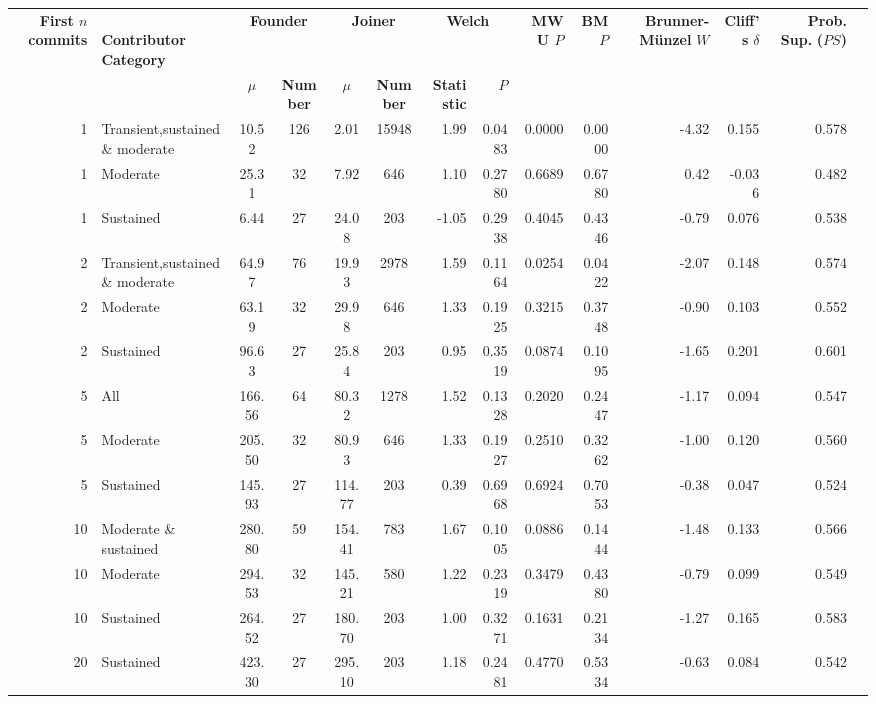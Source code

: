 \begin{landscape}
\begin{table}[H]
\begin{tabular}{r p{4cm} c c c c r r r r r r r r}
\toprule
\makecell[t]{\textbf{First $n$}\\\textbf{commits}} & \makecell[t]{\textbf{}\\\textbf{Contributor}\\\textbf{Category}} & \multicolumn{2}{c}{\textbf{Founder}} & \multicolumn{2}{c}{\textbf{Joiner}} & \multicolumn{2}{c}{\textbf{Welch}} & \textbf{MWU $P$} & \textbf{BM $P$} & \makecell[t]{\textbf{}\\\textbf{Brunner-Münzel}\\\textbf{$W$}} & \makecell[t]{\textbf{Cliff's}\\\textbf{$\delta$}} & \makecell[t]{\textbf{Prob. Sup.}\\\textbf{($PS$)}} \\ 
\cmidrule(lr){3-4} \cmidrule(lr){5-6} \cmidrule(lr){7-8}
 &  & \textbf{$\mu$} & \textbf{Number} & \textbf{$\mu$} & \textbf{Number} & \textbf{Statistic} & \textbf{$P$} &  &  &  &  &  \\ 
\midrule
1 & Transient,sustained \& moderate &  10.52 & 126 & 2.01 & 15948 & 1.99 & 0.0483 & 0.0000 & 0.0000 & -4.32 & 0.155 & 0.578 \\ 
1 & Moderate &  25.31 & 32 & 7.92 & 646 & 1.10 & 0.2780 & 0.6689 & 0.6780 & 0.42 & -0.036 & 0.482 \\ 
1 & Sustained &  6.44 & 27 & 24.08 & 203 & -1.05 & 0.2938 & 0.4045 & 0.4346 & -0.79 & 0.076 & 0.538 \\ 
2 & Transient,sustained \& moderate &  64.97 & 76 & 19.93 & 2978 & 1.59 & 0.1164 & 0.0254 & 0.0422 & -2.07 & 0.148 & 0.574 \\ 
2 & Moderate &  63.19 & 32 & 29.98 & 646 & 1.33 & 0.1925 & 0.3215 & 0.3748 & -0.90 & 0.103 & 0.552 \\ 
2 & Sustained &  96.63 & 27 & 25.84 & 203 & 0.95 & 0.3519 & 0.0874 & 0.1095 & -1.65 & 0.201 & 0.601 \\ 
5 & All &  166.56 & 64 & 80.32 & 1278 & 1.52 & 0.1328 & 0.2020 & 0.2447 & -1.17 & 0.094 & 0.547 \\ 
5 & Moderate &  205.50 & 32 & 80.93 & 646 & 1.33 & 0.1927 & 0.2510 & 0.3262 & -1.00 & 0.120 & 0.560 \\ 
5 & Sustained &  145.93 & 27 & 114.77 & 203 & 0.39 & 0.6968 & 0.6924 & 0.7053 & -0.38 & 0.047 & 0.524 \\ 
10 & Moderate \& sustained &  280.80 & 59 & 154.41 & 783 & 1.67 & 0.1005 & 0.0886 & 0.1444 & -1.48 & 0.133 & 0.566 \\ 
10 & Moderate &  294.53 & 32 & 145.21 & 580 & 1.22 & 0.2319 & 0.3479 & 0.4380 & -0.79 & 0.099 & 0.549 \\ 
10 & Sustained &  264.52 & 27 & 180.70 & 203 & 1.00 & 0.3271 & 0.1631 & 0.2134 & -1.27 & 0.165 & 0.583 \\ 
20 & Sustained &  423.30 & 27 & 295.10 & 203 & 1.18 & 0.2481 & 0.4770 & 0.5334 & -0.63 & 0.084 & 0.542 \\ 
\bottomrule
\end{tabular}%
\label{tab:codebase_graph_latex_repository_graph_component_time_series_statistical_significance_test_methods_previous} 
\end{table}
\end{landscape}
\newpage 
